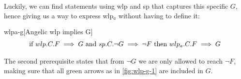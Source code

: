 Luckily, we can find statements using wlp and sp that captures this specific $G$, hence giving us a way to express wlp$_a$ without having to define it: 
\begin{lemma}{wlpa-g}[Angelic wlp implies G]
\ \\ \vspace{-3mm}
	\[\hspace{-2mm}
	\text{ if } \\
	wlp.C.F\implies G
	\\\text{ and } \\ 
	sp.C.\neg G \implies \neg F 
	\\\text{ then } \\ 
	wlp_a.C.F \implies G
	\] 
	\label{lem:wlp-g}
\end{lemma}
The second prerequisite  states that from $\neg G$ we are only allowed to reach $\neg F$, making sure that all green arrows as in \autoref{fig:wlp-g-1} are included in $G$. 

